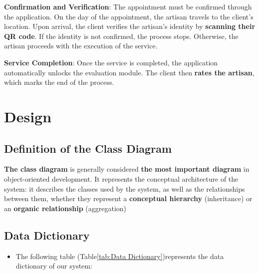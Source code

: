\documentclass[12pt,a4paper]{report}
\begin{document}
\textbf{Confirmation and Verification}: The appointment must be confirmed through the application. On the day of the appointment, the artisan travels to the client's location. Upon arrival, the client verifies the artisan's identity by \textbf{scanning their QR code}. If the identity is not confirmed, the process stops. Otherwise, the artisan proceeds with the execution of the service.

\vspace{8pt}

\textbf{Service Completion}: Once the service is completed, the application automatically unlocks the evaluation module. The client then \textbf{rates the artisan}, which marks the end of the process.
\section{Design}
\subsection{ Definition of the Class Diagram}
   \textbf{The class diagram} is generally considered \textbf{the most important diagram }in object-oriented development. It represents the conceptual architecture of the system: it describes the classes used by the system, as well as the relationships between them, whether they represent a \textbf{conceptual hierarchy} (inheritance) or an \textbf{organic relationship }(aggregation)\cite{ref4}
\subsection{Data Dictionary}
\begin{itemize}
    \item The following table (Table\ref{tab:Data Dictionary})represents the data dictionary of our system:
\end{itemize}
\end{document}
